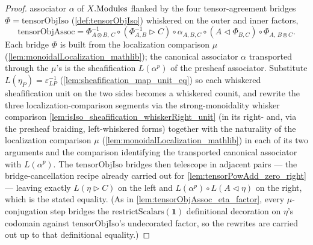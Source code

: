 \begin{proof}
  \leanok
  associator \(\alpha\) of \(X.\mathrm{Modules}\) flanked by the four tensor-agreement
  bridges \(\Phi = \mathrm{tensorObjIso}\) (\cref{def:tensorObjIso}) whiskered on the
  outer and inner factors,
  \[
    \mathrm{tensorObjAssoc} = \Phi^{-1}_{A\otimes B,\,C}
      \circ (\Phi^{-1}_{A,B} \rhd C) \circ \alpha_{A,B,C}
      \circ (A \lhd \Phi_{B,C}) \circ \Phi_{A,\,B\otimes C}.
  \]
  Each bridge \(\Phi\) is built from the localization comparison \(\mu\)
  (\cref{lem:monoidalLocalization_mathlib}); the canonical associator \(\alpha\)
  transported through the \(\mu\)'s is the sheafification \(L(\alpha^{p})\) of the
  presheaf associator. Substitute \(L(\eta_P) = \varepsilon_{LP}^{-1}\)
  (\cref{lem:sheafification_map_unit_eq}) so each whiskered sheafification unit on the
  two sides becomes a whiskered counit, and rewrite the three localization-comparison
  segments via the strong-monoidality whisker comparison
  \cref{lem:isIso_sheafification_whiskerRight_unit} (in its right- and, via the
  presheaf braiding, left-whiskered forms) together with the naturality of the
  localization comparison \(\mu\) (\cref{lem:monoidalLocalization_mathlib}) in each of
  its two arguments and the comparison identifying the transported canonical associator
  with \(L(\alpha^{p})\). The \(\mathrm{tensorObjIso}\) bridges
  then telescope in adjacent pairs --- the bridge-cancellation recipe already carried
  out for \cref{lem:tensorPowAdd_zero_right} --- leaving exactly
  \(L(\eta \rhd C)\) on the left and \(L(\alpha^{p}) \circ L(A \lhd \eta)\) on the
  right, which is the stated equality. (As in \cref{lem:tensorObjAssoc_eta_factor},
  every \(\mu\)-conjugation step bridges the
  \(\mathrm{restrictScalars}(\mathbf{1})\) definitional decoration on \(\eta\)'s
  codomain against \(\mathrm{tensorObjIso}\)'s undecorated factor, so the rewrites are
  carried out up to that definitional equality.)
\end{proof}

